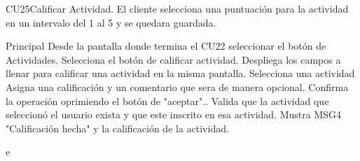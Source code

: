 
\begin{UseCase}{CU25}{Calificar Actividad.}{
		El cliente selecciona una puntuación para la actividad en un intervalo del 1 al 5 y se quedara guardada.
	}
\end{UseCase}

\begin{UCtrayectoria}{Principal}
	\UCpaso[\UCactor] Desde la pantalla donde termina el CU22 seleccionar el botón de Actividades.
	\UCpaso[\UCactor] Selecciona el botón de calificar actividad.
	\UCpaso Despliega los campos a llenar para calificar una actividad en la misma pantalla.
	\UCpaso[\UCactor] Selecciona una actividad
	\UCpaso[\UCactor] Asigna una calificación y un comentario que sera de manera opcional.
	\UCpaso[\UCactor] Confirma la operación oprimiendo el botón de "aceptar"..
	\UCpaso Valida que la actividad que seleccionó el usuario exista y que este inscrito en esa actividad.
	\UCpaso Mustra MSG4 "Calificación hecha" y la calificación de la actividad.
	
\end{UCtrayectoria}

e%



